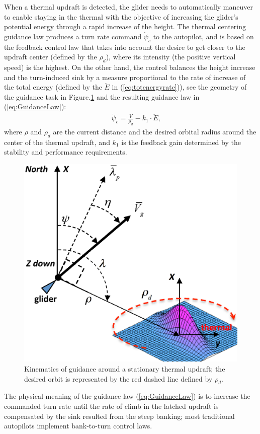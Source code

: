 \documentclass[letterpaper, 10 pt, conference]{ieeeconf}  %
\begin{document}

When a thermal updraft is detected, the glider needs to automatically maneuver to enable staying in the thermal with the objective of increasing the glider's potential energy through a rapid increase of the height. The thermal centering guidance law produces a turn rate command $\dot{\psi}_{c}$ to the autopilot, and is based on the feedback control law that takes into account the desire to get closer to the updraft center (defined by the $\rho_d$), where its intensity (the positive vertical speed) is the highest. On the other hand, the control balances the height increase and the turn-induced sink by a measure proportional to the rate of increase of the total energy (defined by the $\ddot{E}$ in (\ref{eq:totenergyrate})), see the geometry of the guidance task in Figure.\ref{fig:ThermaG} and the resulting guidance law in (\ref{eq:GuidanceLaw}):
\begin{eqnarray}
    && \dot{\psi}_{c}=\frac{V}{\rho_d}-k_1 \cdot \ddot{E},
    \label{eq:GuidanceLaw}
\end{eqnarray}
where $\rho$ and $\rho_d$ are the current distance and the desired orbital radius around the center of the thermal updraft, and $k_1$ is the feedback gain determined by the stability and performance requirements.
\begin{figure}[thpb]
  \centering
  \includegraphics[scale=0.25]{Figures/ThermalG.eps}
  \caption{Kinematics of guidance around a stationary thermal updraft;
  the desired orbit is represented by the red dashed line defined by $\rho_d$.}
  \label{fig:ThermaG}
\end{figure}
The physical meaning of the guidance law (\ref{eq:GuidanceLaw}) is to increase the commanded turn rate until the rate of climb in the latched updraft is compensated by the sink resulted from the steep banking; most traditional autopilots implement bank-to-turn control laws.
\end{document}
